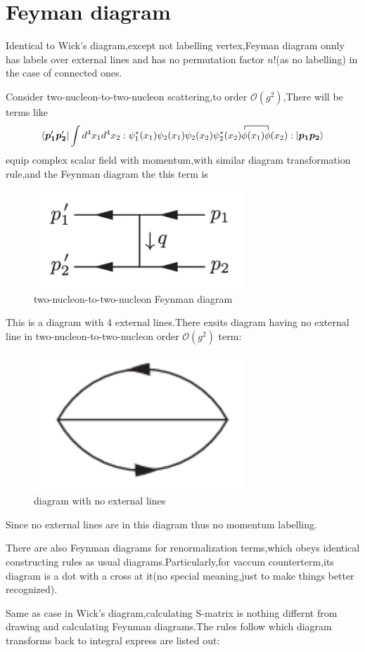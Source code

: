 \documentclass[a4paper]{article}
\begin{document}
\section{Feyman diagram}
Identical to Wick's diagram,except not labelling vertex,Feyman diagram onnly has labels over external lines and has no permutation factor $n!$(as no labelling) in the case of connected ones.
\par Consider two-nucleon-to-two-nucleon scattering,to order $\mathscr{O}(g^2)$,There will be terms like$$\bra{\bm{p_1}'\bm{p_2}'}\int d^4x_1d^4x_2:\psi_1^*(x_1)\psi_2(x_1)\psi_2(x_2)\psi_2^*(x_2)\contraction{}{\phi}{(x_1)}{\phi}\phi(x_1)\phi(x_2):\ket{\bm{p_1}\bm{p_2}}$$
equip complex scalar field with momentum,with similar diagram transformation rule,and the Feynman diagram the this term is
\begin{figure}[htbp]
	\centering
	\includegraphics[width=0.7\textwidth]{4.png}
	\caption{two-nucleon-to-two-nucleon Feynman diagram}
\end{figure}
This is a diagram with 4 external lines.There exsits diagram having no external line in two-nucleon-to-two-nucleon order $\mathscr{O}(g^2)$ term:
\begin{figure}[htbp]
	\centering
	\includegraphics[width=0.7\textwidth]{5.png}
	\caption{diagram with no external lines}
\end{figure}

Since no external lines are in this diagram thus no momentum labelling.
\par There are also Feynman diagrams for renormalization terms,which obeys identical constructing rules as usual diagrams.Particularly,for vaccum counterterm,its diagram is a dot with a cross at it(no special meaning,just to make things better recognized).
\vspace{0.3\textheight}
\par Same as case in Wick's diagram,calculating S-matrix is nothing differnt from drawing and calculating Feynman diagrams.The rules follow which diagram transforms back to integral express are listed out:
\end{document}
